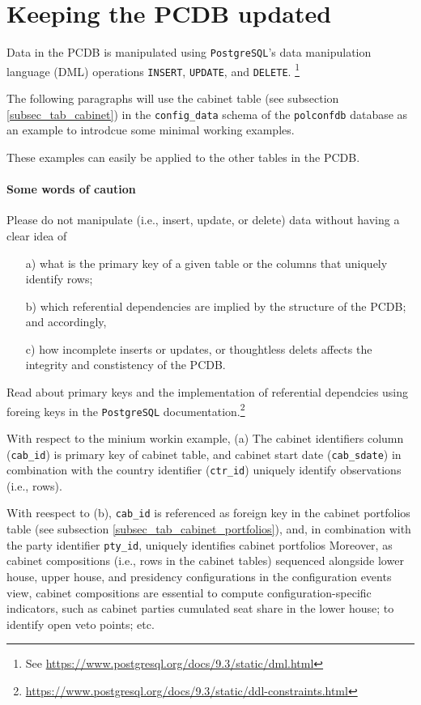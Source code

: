 \section{Keeping the PCDB updated}\label{sec_keeping_the_PCDB_updated}

Data in the PCDB is manipulated using \texttt{PostgreSQL}'s data manipulation language (DML) operations \texttt{INSERT}, \texttt{UPDATE}, and \texttt{DELETE}. \footnote{See \url{https://www.postgresql.org/docs/9.3/static/dml.html}}

The following paragraphs will use the cabinet table (see subsection \ref{subsec_tab_cabinet}) in the \texttt{config\_data} schema of the \texttt{polconfdb} database as an example to introdcue some minimal working examples.

These examples can easily be applied to the other tables in the PCDB. 

\paragraph{Some words of caution} 
Please do not manipulate (i.e., insert, update, or delete) data without having a clear idea of 
\begin{itemize}
\item[a)]what is the primary key of a given table or the columns that uniquely identify rows;
\item[b)]which referential dependencies are implied by the structure of the PCDB; and accordingly,
\item[c)]how incomplete inserts or updates, or thoughtless delets affects the integrity and constistency of the PCDB.
\end{itemize}
Read about primary keys and the implementation of referential dependcies using foreing keys in the \texttt{PostgreSQL} documentation.\footnote{\url{https://www.postgresql.org/docs/9.3/static/ddl-constraints.html}}

With respect to the minium workin example, 
(a) The cabinet identifiers column (\texttt{cab\_id}) is primary key of cabinet table, and cabinet start date (\texttt{cab\_sdate}) in combination with the country identifier (\texttt{ctr\_id}) uniquely identify observations (i.e., rows). 

With reespect to (b), \texttt{cab\_id} is referenced as foreign key in the cabinet portfolios table (see subsection \ref{subsec_tab_cabinet_portfolios}), and, in combination with the party identifier \texttt{pty\_id}, uniquely identifies cabinet portfolios
Moreover, as cabinet compositions (i.e., rows in the cabinet tables) sequenced alongside lower house, upper house, and presidency configurations in the configuration events view, cabinet compositions are essential to compute configuration-specific indicators, such as cabinet parties cumulated seat share in the lower house; to identify open veto points; etc.


